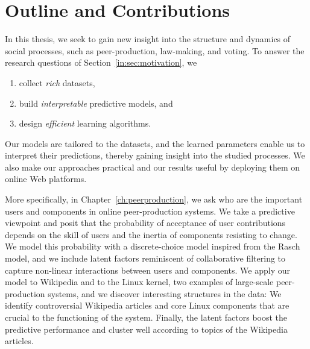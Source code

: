 \section{Outline and Contributions}
\label{in:sec:outline}

In this thesis, we seek to gain new insight into the structure and dynamics of social processes, such as peer-production, law-making, and voting.
To answer the research questions of Section~\ref{in:sec:motivation}, we
\begin{enumerate}
	\item collect \emph{rich} datasets,
	\item build \emph{interpretable} predictive models, and
	\item design \emph{efficient} learning algorithms.
\end{enumerate}
Our models are tailored to the datasets, and the learned parameters enable us to interpret their predictions, thereby gaining insight into the studied processes.
We also make our approaches practical and our results useful by deploying them on online Web platforms.


More specifically, in Chapter~\ref{ch:peerproduction}, we ask who are the important users and components in online peer-production systems.
We take a predictive viewpoint and posit that the probability of acceptance of user contributions depends on the skill of users and the inertia of components resisting to change.
We model this probability with a discrete-choice model inspired from the Rasch model, and we include latent factors reminiscent of collaborative filtering to capture non-linear interactions between users and components.
We apply our model to Wikipedia and to the Linux kernel, two examples of large-scale peer-production systems, and we discover interesting structures in the data:
We identify controversial Wikipedia articles and core Linux components that are crucial to the functioning of the system.
Finally, the latent factors boost the predictive performance and cluster well according to topics of the Wikipedia articles.

